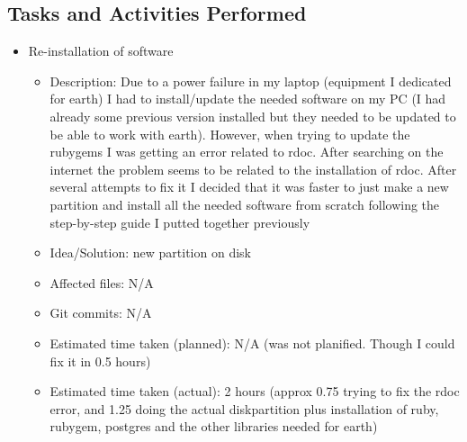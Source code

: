 \documentclass{article}
\begin{document}
\subsection{Tasks and Activities Performed}

\begin{itemize}
	\item Re-installation of software
	     \begin{itemize}
                \item Description: Due to a power failure in my laptop (equipment I dedicated for earth) I had to install/update  the needed software on my PC (I had already some previous version installed but they needed to be updated to be able to work with earth).  However, when trying to update the rubygems I was getting an error related to rdoc.  After searching on the internet the problem seems to be related to the installation of rdoc.  After several attempts to fix it I decided that it was faster to just make a new partition and install all the needed software from scratch following the step-by-step guide I putted together previously
                \item Idea/Solution: new partition on disk
                \item Affected files: N/A
                \item Git commits: N/A
                \item Estimated time taken (planned): N/A (was not planified.  Though I could fix it in 0.5 hours)
                \item Estimated time taken (actual): 2 hours (approx 0.75 trying to fix the rdoc error, and 1.25 doing the actual diskpartition plus installation of ruby, rubygem, postgres and the other libraries needed for earth)
            

\end{itemize}
\end{itemize}
\end{document}
